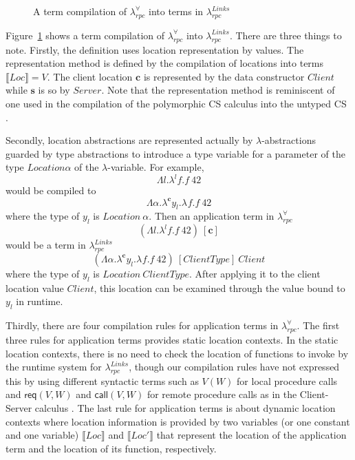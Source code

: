 \documentclass[a4paper]{article}
\theoremstyle{plain}
\theoremstyle{definition}
\newcommand{\rulewidth}{.8\linewidth}
\newcommand{\ruleverticalsephalf}{0.25cm}
\newcommand{\ruleverticalsep}{0.5cm}
\newcommand{\polyrpc}{$\lambda_{rpc}^{\forall}$\xspace}
\newcommand{\linksrpc}{$\lambda_{rpc}^{Links}$\xspace}
\newcommand{\client}{\textbf{c}}
\newcommand{\server}{\textbf{s}}
\newcommand{\lamL}[3]{\lambda^{#1}#2.#3}
\newcommand{\subst}[2]{\{#1/#2\}}
\newcommand{\textsfReq}{\textsf{req}}
\newcommand{\req}[2]{\textsfReq(#1,#2)}
\newcommand{\textsfCall}{\textsf{call}}
\newcommand{\call}[2]{\textsfCall(#1,#2)}
\newcommand{\tyenv}{\Gamma}
\newcommand{\judgcomp}[2]{\llbracket#1\rrbracket_{#2}}
\newcommand{\loctycomp}[1]{L\llbracket#1\rrbracket}
\newcommand{\polytycomp}[1]{T\llbracket#1\rrbracket}
\newcommand{\anncomp}[1]{Ann\llbracket#1\rrbracket}
\newcommand{\loctmcomp}[1]{\llbracket#1\rrbracket}
\newcommand{\Loc}{Loc}
\begin{document}
\begin{figure}[t]
\caption{A term compilation of \polyrpc into terms in \linksrpc}
\label{fig:termcompilationback}
\end{figure}

%
Figure~\ref{fig:termcompilationback} shows a term compilation of
\polyrpc into \linksrpc.
%
There are three things to note.
%
Firstly, the definition uses location representation by values.
%
The representation method is defined by the compilation of locations
into terms $\loctmcomp{\Loc}=V$.
%
The client location $\client$ is represented by the data constructor
$Client$ while $\server$ is so by $Server$.
%
Note that the representation method is reminiscent of one used in the
compilation of the polymorphic CS calculus into the untyped CS
\cite{cclr2021}.

%
Secondly, location abstractions are represented actually by
$\lambda$-abstractions guarded by type abstractions to introduce a
type variable for a parameter of the type $Location \alpha$ of the
$\lambda$-variable.
%
For example,
\[
\Lambda l.\lamL{l}{f}{f \ 42}
\]
would be compiled to
\[
\Lambda\alpha.\lamL{\client}{y_l}{\lamL{}{f}{f \ 42}}
\]
where the type of
$y_l$ is $Location \ \alpha$.
%
Then an application term in \polyrpc 
\[
(\Lambda l.\lamL{l}{f}{f \ 42}) \ [\client]
\]
would be a term in \linksrpc
\[
(\Lambda\alpha.\lamL{\client}{y_l}{\lamL{}{f}{f \ 42}}) \ [ClientType]
\ Client
\]
where the type of $y_l$ is $Location \ ClientType$.
%
After applying it to the client location value $Client$, this location
can be examined through the value bound to $y_l$ in runtime.

%
Thirdly, there are four compilation rules for application terms in
\polyrpc.
%
The first three rules for application terms provides static location
contexts.
%
In the static location contexts, there is no need to check the
location of functions to invoke by the runtime system for \linksrpc,
though our compilation rules have not expressed this by using
different syntactic terms such as $V(W)$ for local procedure calls and
$\req{V}{W}$ and $\call{V}{W}$ for remote procedure calls as in the
Client-Server calculus \cite{cclr2021}.
%
The last rule for application terms is about dynamic location contexts
where location information is provided by two variables (or one
constant and one variable) $\loctmcomp{\Loc}$ and $\loctmcomp{\Loc'}$
that represent the location of the application term and the location
of its function, respectively.
\end{document}
